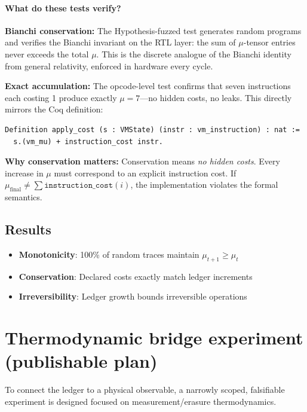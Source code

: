\paragraph{What do these tests verify?}

\textbf{Bianchi conservation:} The Hypothesis-fuzzed test generates random programs and verifies the Bianchi invariant on the RTL layer: the sum of $\mu$-tensor entries never exceeds the total $\mu$. This is the discrete analogue of the Bianchi identity from general relativity, enforced in hardware every cycle.

\textbf{Exact accumulation:} The opcode-level test confirms that seven instructions each costing 1 produce exactly $\mu=7$---no hidden costs, no leaks. This directly mirrors the Coq definition:
\begin{lstlisting}
Definition apply_cost (s : VMState) (instr : vm_instruction) : nat :=
  s.(vm_mu) + instruction_cost instr.
\end{lstlisting}

\textbf{Why conservation matters:} Conservation means \textit{no hidden costs}. Every increase in $\mu$ must correspond to an explicit instruction cost. If $\mu_{\text{final}} \neq \sum \texttt{instruction\_cost}(i)$, the implementation violates the formal semantics.

\subsection{Results}

\begin{itemize}
    \item \textbf{Monotonicity}: 100\% of random traces maintain $\mu_{t+1} \ge \mu_t$
    \item \textbf{Conservation}: Declared costs exactly match ledger increments
    \item \textbf{Irreversibility}: Ledger growth bounds irreversible operations
\end{itemize}

\section{Thermodynamic bridge experiment (publishable plan)}



To connect the ledger to a physical observable, a narrowly scoped, falsifiable experiment is designed focused on measurement/erasure thermodynamics.

